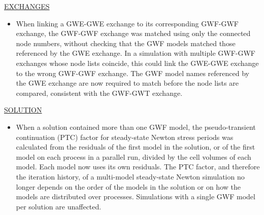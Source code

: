 \underline{EXCHANGES}
\begin{itemize}
\item When linking a GWE-GWE exchange to its corresponding GWF-GWF exchange, the GWF-GWF exchange was matched using only the connected node numbers, without checking that the GWF models matched those referenced by the GWE exchange. In a simulation with multiple GWF-GWF exchanges whose node lists coincide, this could link the GWE-GWE exchange to the wrong GWF-GWF exchange. The GWF model names referenced by the GWE exchange are now required to match before the node lists are compared, consistent with the GWF-GWT exchange.
\end{itemize}

\underline{SOLUTION}
\begin{itemize}
\item When a solution contained more than one GWF model, the pseudo-transient continuation (PTC) factor for steady-state Newton stress periods was calculated from the residuals of the first model in the solution, or of the first model on each process in a parallel run, divided by the cell volumes of each model. Each model now uses its own residuals. The PTC factor, and therefore the iteration history, of a multi-model steady-state Newton simulation no longer depends on the order of the models in the solution or on how the models are distributed over processes. Simulations with a single GWF model per solution are unaffected.
\end{itemize}
